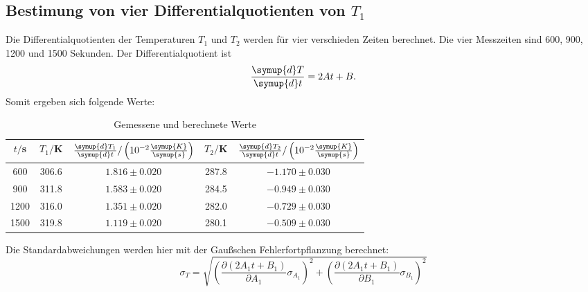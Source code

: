 \subsection{Bestimung von vier Differentialquotienten von $T_1$}
Die Differentialquotienten der Temperaturen $T_1$ und $T_2$ werden für vier verschieden
Zeiten berechnet. Die vier Messzeiten sind 600, 900, 1200 und 1500 Sekunden. Der
Differentialquotient ist
\begin{equation}
  \frac{\symup{d}T}{\symup{d}t} = 2At + B .
\end{equation}
Somit ergeben sich folgende Werte:
\begin{table}
  \centering
  \caption{Gemessene und berechnete Werte}
  \label{tab:Parameter}
  \begin{tabular}{c c c c c}
    \toprule
    $t/$s & $T_1/$K & $\frac{\symup{d}T_1}{\symup{d}t}/\left(10^{-2}\frac{\symup{K}}{\symup{s}}\right)$ & $T_2/$K & $\frac{\symup{d}T_2}{\symup{d}t}/\left(10^{-2}\frac{\symup{K}}{\symup{s}}\right)$  \\
    \midrule
      600 &  306.6 & $1.816 \pm 0.020$ & 287.8 & $-1.170  \pm 0.030$ \\
      900 &  311.8 & $1.583 \pm 0.020$ & 284.5 & $-0.949  \pm 0.030$ \\
      1200 & 316.0 & $1.351 \pm 0.020$ & 282.0 & $-0.729 \pm 0.030$ \\
      1500 & 319.8 & $1.119 \pm 0.020$ & 280.1 & $-0.509 \pm 0.030$ \\
   \bottomrule
 \end{tabular}
\end{table}

Die Standardabweichungen werden hier mit der Gaußschen Fehlerfortpflanzung berechnet: \\
\begin{equation}
  \sigma_T = \sqrt{
      \left( \frac{\partial(2A_1t + B_1)}{\partial A_1} \sigma_{A_1} \right)^{\!\! 2} +
      \left( \frac{\partial \left( 2A_1t + B_1 \right)}{\partial B_1} \sigma_{B_1} \right)^{\!\! 2}
    }
\end{equation}


